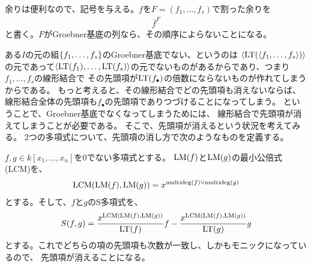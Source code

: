 \documentclass[9pt]{ltjsarticle}
\begin{document}
余りは便利なので、記号を与える。$f$を$F=(f_1,\dots,f_s)$で割った余りを
\begin{align}
  \overline f^{F}
\end{align}
と書く。$F$がGroebner基底の列なら、その順序によらないことになる。

ある$I$の元の組$\left\{f_1,\dots,f_s\right\}$のGroebner基底でない、というのは
$\left\langle {\rm LT}(\left\langle f_1,\dots,f_s \right\rangle) \right\rangle$の元であって$\left\langle {\rm LT}(f_1),\dots,{\rm LT}(f_s) \right\rangle$の元でないものがあるからであり、つまり$f_1,\dots,f_s$の線形結合で
その先頭項が${\rm LT}(f_\bullet)$の倍数にならないものが作れてしまうからである。
もっと考えると、その線形結合でどの先頭項も消えないならば、
線形結合全体の先頭項も$f_\bullet$の先頭項でありつづけることになってしまう。
ということで、Groebner基底でなくなってしまうためには、
線形結合で先頭項が消えてしまうことが必要である。
そこで、先頭項が消えるという状況を考えてみる。
2つの多項式について、先頭項の消し方で次のようなものを定義する。

$f,g\in k[x_1,\dots,x_n]$を0でない多項式とする。
${\rm LM}(f)$と${\rm LM}(g)$の最小公倍式(LCM)を、
\begin{align}
  \mathrm{LCM}({\rm LM}(f),{\rm LM}(g)) = x^{\mathrm{multideg}(f) \vee \mathrm{multideg}(g)}
\end{align}
とする。そして、$f$と$g$のS多項式を、
\begin{align}
  S(f,g) = \frac{x^{\mathrm{LCM}({\rm LM}(f),{\rm LM}(g))}}{{\rm LT}(f)}f - \frac{x^{\mathrm{LCM}({\rm LM}(f),{\rm LM}(g))}}{{\rm LT}(g)}g
\end{align}
とする。これでどちらの項の先頭項も次数が一致し、しかもモニックになっているので、
先頭項が消えることになる。
\end{document}
